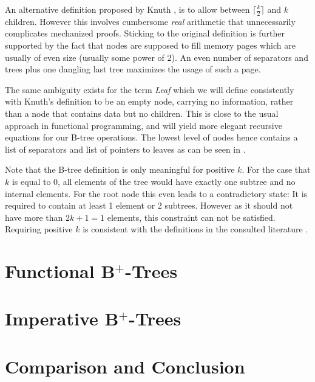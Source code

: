 \documentclass[a4paper,UKenglish,cleveref, autoref, thm-restate]{lipics-v2021}
\begin{document}
An alternative definition proposed by Knuth \cite{DBLP:books/lib/Knuth98a},
is to allow between $\lceil \frac{k}{2} \rceil$ and $k$ children.
However this involves cumbersome \textit{real} arithmetic that unnecessarily complicates
mechanized proofs.
Sticking to the original definition is further supported by the fact that nodes are supposed
to fill memory pages which are usually of even size (usually some power of 2).
An even number of separators and trees plus one dangling last tree maximizes
the usage of such a page.

The same ambiguity exists for the term \textit{Leaf} which we will define consistently with Knuth's definition \cite{DBLP:books/lib/Knuth98a}
to be an empty node, carrying no information,
rather than a node that contains data but no children.
This is close to the usual approach in functional programming,
and will yield more elegant recursive equations for our B-tree operations.
The lowest level of nodes hence contains a list of separators and
list of pointers to leaves as can be seen in .

Note that the B-tree definition is only meaningful for positive $k$.
For the case that $k$ is equal to 0,
all elements of the tree would have exactly one subtree
and no internal elements.
For the root node this even leads to a contradictory state:
It is required to contain at least 1 element or 2 subtrees.
However as it should not have more than $2k+1 = 1$ elements,
this constraint can not be satisfied.
Requiring positive $k$ is consistent with the definitions
in the consulted literature \cite{DBLP:journals/acta/BayerM72,DBLP:journals/csur/Comer79,DBLP:books/daglib/0023376}.

\section{Functional B$^+$-Trees}
\label{sec:functional}

\section{Imperative B$^+$-Trees}
\label{sec:imperative}

\section{Comparison and Conclusion}
\label{sec:conclusion}
\end{document}
